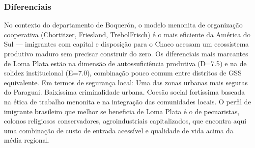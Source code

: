 \subsubsection*{Diferenciais}\label{dif-loma-plata-1605}
No contexto do departamento de Boquerón, o modelo menonita de organização cooperativa (Chortitzer, Friesland, TrebolFrisch) é o mais eficiente da América do Sul — imigrantes com capital e disposição para o Chaco acessam um ecossistema produtivo maduro sem precisar construir do zero. Os diferenciais mais marcantes de Loma Plata estão na dimensão de autossuficiência produtiva (D=7.5) e na de solidez institucional (E=7.0), combinação pouco comum entre distritos de GSS equivalente. Em termos de segurança local: Uma das zonas urbanas mais seguras do Paraguai. Baixíssima criminalidade urbana. Coesão social fortíssima baseada na ética de trabalho menonita e na integração das comunidades locais. O perfil de imigrante brasileiro que melhor se beneficia de Loma Plata é o de pecuaristas, colonos religiosos conservadores, agroindustriais capitalizados, que encontra aqui uma combinação de custo de entrada acessível e qualidade de vida acima da média regional.
